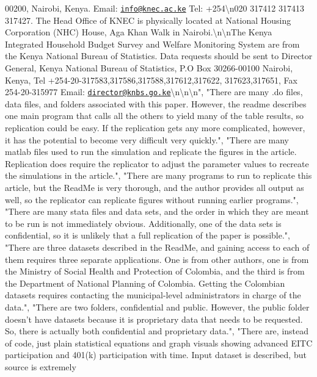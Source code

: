 \documentclass[]{article}
\begin{document}
\begin{itemize}
  00200, Nairobi, Kenya. Email:
  \href{mailto:info@knec.ac.ke}{\nolinkurl{info@knec.ac.ke}} Tel:
  +254\textbackslash{}n020 317412 317413 317427. The Head Office of KNEC
  is physically located at National Housing Corporation (NHC) House, Aga
  Khan Walk in Nairobi.\textbackslash{}n\textbackslash{}nThe Kenya
  Integrated Household Budget Survey and Welfare Monitoring System are
  from the Kenya National Bureau of Statistics. Data requests should be
  sent to Director General, Kenya National Bureau of Statistics, P.O Box
  30266-00100 Nairobi, Kenya, Tel
  +254-20-317583,317586,317588,317612,317622, 317623,317651, Fax
  254-20-315977 Email:
  \href{mailto:director@knbs.go.ke}{\nolinkurl{director@knbs.go.ke}}\textbackslash{}n\textbackslash{}n\textbackslash{}n",
  "There are many .do files, data files, and folders associated with
  this paper. However, the readme describes one main program that calls
  all the others to yield many of the table results, so replication
  could be easy. If the replication gets any more complicated, however,
  it has the potential to become very difficult very quickly.", "There
  are many matlab files used to run the simulation and replicate the
  figures in the article. Replication does require the replicator to
  adjust the parameter values to recreate the simulations in the
  article.", "There are many programs to run to replicate this article,
  but the ReadMe is very thorough, and the author provides all output as
  well, so the replicator can replicate figures without running earlier
  programs.", "There are many stata files and data sets, and the order
  in which they are meant to be run is not immediately obvious.
  Additionally, one of the data sets is confidential, so it is unlikely
  that a full replication of the paper is possible.", "There are three
  datasets described in the ReadMe, and gaining access to each of them
  requires three separate applications. One is from other authors, one
  is from the Ministry of Social Health and Protection of Colombia, and
  the third is from the Department of National Planning of Colombia.
  Getting the Colombian datasets requires contacting the municipal-level
  administrators in charge of the data.", "There are two folders,
  confidential and public. However, the public folder doesn't have
  datasets because it is proprietary data that needs to be requested.
  So, there is actually both confidential and proprietary data.", "There
  are, instead of code, just plain statistical equations and graph
  visuals showing advanced EITC participation and 401(k) participation
  with time. Input dataset is described, but source is extremely

\end{itemize}
\end{document}
